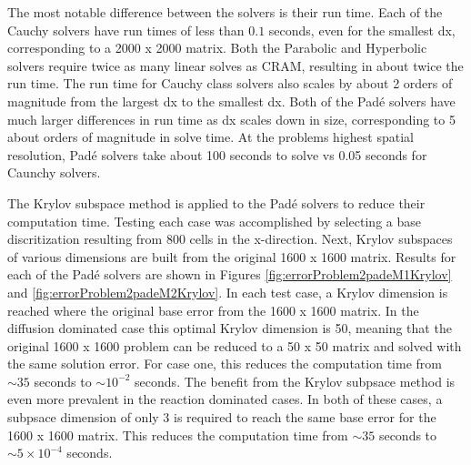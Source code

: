 The most notable difference between the solvers is their run time. Each of the Cauchy solvers have run times of less than $0.1$ seconds, even for the smallest dx, corresponding to a 2000 x 2000 matrix. Both the Parabolic and Hyperbolic solvers require twice as many linear solves as CRAM, resulting in about twice the run time. The run time for Cauchy class solvers also scales by about 2 orders of magnitude from the largest dx to the smallest dx. Both of the Pad\'e solvers have much larger differences in run time as dx scales down in size, corresponding to 5 about orders of magnitude in solve time. At the problems highest spatial resolution, Pad\'e solvers take about 100 seconds to solve vs 0.05 seconds for Caunchy solvers. 

The Krylov subspace method is applied to the Pad\'e solvers to reduce their computation time. Testing each case was accomplished by selecting a base discritization resulting from 800 cells in the x-direction. Next, Krylov subspaces of various dimensions are built from the original 1600 x 1600 matrix. Results for each of the Pad\'e solvers are shown in Figures \ref{fig:errorProblem2padeM1Krylov} and \ref{fig:errorProblem2padeM2Krylov}. In each test case, a Krylov dimension is reached where the original base error from the 1600 x 1600 matrix. In the diffusion dominated case this optimal Krylov dimension is 50, meaning that the original 1600 x 1600 problem can be reduced to a 50 x 50 matrix and solved with the same solution error. For case one, this reduces the computation time from $\sim35$ seconds to $\sim 10^{-2}$ seconds. The benefit from the Krylov subpsace method is even more prevalent in the reaction dominated cases. In both of these cases, a subpsace dimension of only 3 is required to reach the same base error for the 1600 x 1600 matrix. This reduces the computation time from $\sim 35$ seconds to $\sim 5\times 10^{-4}$ seconds. 


\FloatBarrier

